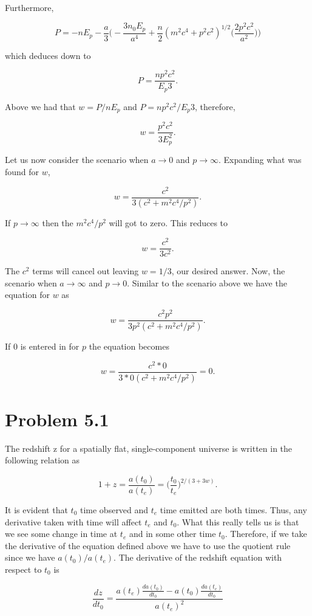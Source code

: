 \documentclass[12pt]{article}
\begin{document}
Furthermore,

$$
P = -nE_{p} - \frac{a}{3}\Big(-\frac{3n_{0}E_{p}}{a^{4}} + \frac{n}{2}(m^{2}c^{4} + p^{2}c^{2})^{1/2}\Big(\frac{2p^{2}c^{2}}{a^{2}}\Big)\Big)
$$

which deduces down to 

$$
P = \frac{np^{2}c^{2}}{E_{p}3}.
$$

Above we had that $w = P/nE_{p}$ and $P = np^{2}c^{2}/E_{p}3$, therefore,

$$
w = \frac{p^{2}c^{2}}{3E^{2}_{p}}.
$$

Let us now consider the scenario when $a \rightarrow 0$ and $p \rightarrow \infty$.
Expanding what was found for $w$, 

$$
w = \frac{c^{2}}{3(c^{2} + m^{2}c^{4}/p^{2})}.
$$

If $p \rightarrow \infty$ then the $m^{2}c^{4}/p^{2}$ will got to zero. This reduces to 

$$
w = \frac{c^{2}}{3c^{2}}.
$$

The $c^{2}$ terms will cancel out leaving $w = 1/3$, our desired answer. Now, the scenario when $a \rightarrow \infty$ and $p \rightarrow 0$. Similar to the scenario above we have the equation for $w$ as

$$
w = \frac{c^{2}p^{2}}{3p^{2}(c^{2} + m^{2}c^{4}/p^{2})}.
$$

If $0$ is entered in for $p$ the equation becomes

$$
w = \frac{c^{2}*0}{3*0(c^{2} + m^{2}c^{4}/p^{2})} = 0.
$$

\section*{Problem 5.1}

The redshift z for a spatially flat, single-component universe is written in the following relation as 

$$
1 + z = \frac{a(t_{0})}{a(t_{e})} = \Big(\frac{t_{0}}{t_{e}}\Big)^{2/(3+3w)}.
$$

It is evident that $t_{0}$ time observed and $t_{e}$ time emitted are both times. Thus, any derivative taken with time will affect $t_{e}$ and $t_{0}$. What this really tells us is that we see some change in time at $t_{e}$ and in some other time $t_{0}$. Therefore, if we take the derivative of the equation defined above we have to use the quotient rule since we have $a(t_{0})/a(t_{e})$. The derivative of the redshift equation with respect to $t_{0}$ is 

$$
\frac{dz}{dt_{0}} = 
\frac{a(t_{e})
\frac{da(t_{0})}{dt_{0}} -
a(t_{0})
\frac{da(t_{e})}{dt_{0}}
}
{
a(t_{e})^{2}
}
$$
\end{document}
